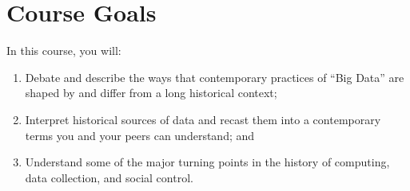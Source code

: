 \section{Course Goals}

In this course, you will:

\begin{enumerate}
\def\labelenumi{\arabic{enumi}.}
\item
  Debate and describe the ways that contemporary practices of ``Big
  Data'' are shaped by and differ from a long historical context;
\item
  Interpret historical sources of data and recast them into a
  contemporary terms you and your peers can understand; and
\item
  Understand some of the major turning points in the history of
  computing, data collection, and social control.
\end{enumerate}
